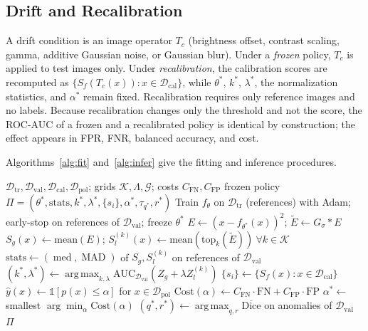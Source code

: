 \documentclass[conference]{IEEEtran}
\newcommand{\Etil}{\tilde{E}}
\DeclareMathOperator*{\argmax}{arg\,max}
\DeclareMathOperator{\med}{med}
\DeclareMathOperator{\MAD}{MAD}
\begin{document}
\subsection{Drift and Recalibration}
A drift condition is an image operator $T_c$ (brightness offset, contrast scaling, gamma, additive Gaussian noise, or Gaussian blur). Under a \emph{frozen} policy, $T_c$ is applied to test images only. Under \emph{recalibration}, the calibration scores are recomputed as $\{S_f(T_c(x)):x\in\mathcal{D}_{\mathrm{cal}}\}$, while $\theta^*$, $k^*$, $\lambda^*$, the normalization statistics, and $\alpha^*$ remain fixed. Recalibration requires only reference images and no labels. Because recalibration changes only the threshold and not the score, the ROC-AUC of a frozen and a recalibrated policy is identical by construction; the effect appears in FPR, FNR, balanced accuracy, and cost.

Algorithms~\ref{alg:fit} and~\ref{alg:infer} give the fitting and inference procedures.

\begin{algorithm}[t]
\caption{RCC-ConvAE policy fitting (test data never accessed)}
\label{alg:fit}
\footnotesize
\begin{algorithmic}[1]
\Require $\mathcal{D}_{\mathrm{tr}},\mathcal{D}_{\mathrm{val}},\mathcal{D}_{\mathrm{cal}},\mathcal{D}_{\mathrm{pol}}$; grids $\mathcal{K},\Lambda,\mathcal{G}$; costs $C_{\mathrm{FN}},C_{\mathrm{FP}}$
\Ensure frozen policy $\Pi=(\theta^*,\mathrm{stats},k^*,\lambda^*,\{s_i\},\alpha^*,\tau_{q^*},r^*)$
\State Train $f_\theta$ on $\mathcal{D}_{\mathrm{tr}}$ (references) with Adam; early-stop on references of $\mathcal{D}_{\mathrm{val}}$; freeze $\theta^*$
  \State $E\gets(x-f_{\theta^*}(x))^2$;\; $\Etil\gets G_\sigma*E$
  \State $S_g(x)\gets\mathrm{mean}(E)$;\; $S_l^{(k)}(x)\gets\mathrm{mean}(\mathrm{top}_k(\Etil))\ \forall k\in\mathcal{K}$
\EndFor
\State $\mathrm{stats}\gets(\med,\MAD)$ of $S_g,S_l^{(k)}$ on references of $\mathcal{D}_{\mathrm{val}}$
\State $(k^*,\lambda^*)\gets\argmax_{k,\lambda}\mathrm{AUC}_{\mathcal{D}_{\mathrm{val}}}(Z_g+\lambda Z_l^{(k)})$
\State $\{s_i\}\gets\{S_f(x):x\in\mathcal{D}_{\mathrm{cal}}\}$
  \State $\hat y(x)\gets\mathbb{1}[p(x)\le\alpha]$ for $x\in\mathcal{D}_{\mathrm{pol}}$
  \State $\mathrm{Cost}(\alpha)\gets C_{\mathrm{FN}}\cdot\mathrm{FN}+C_{\mathrm{FP}}\cdot\mathrm{FP}$
\EndFor
\State $\alpha^*\gets$ smallest $\arg\min_\alpha\mathrm{Cost}(\alpha)$
\State $(q^*,r^*)\gets\argmax_{q,r}\overline{\mathrm{Dice}}$ on anomalies of $\mathcal{D}_{\mathrm{val}}$
\State \Return $\Pi$ 
\end{algorithmic}
\end{algorithm}
\end{document}
